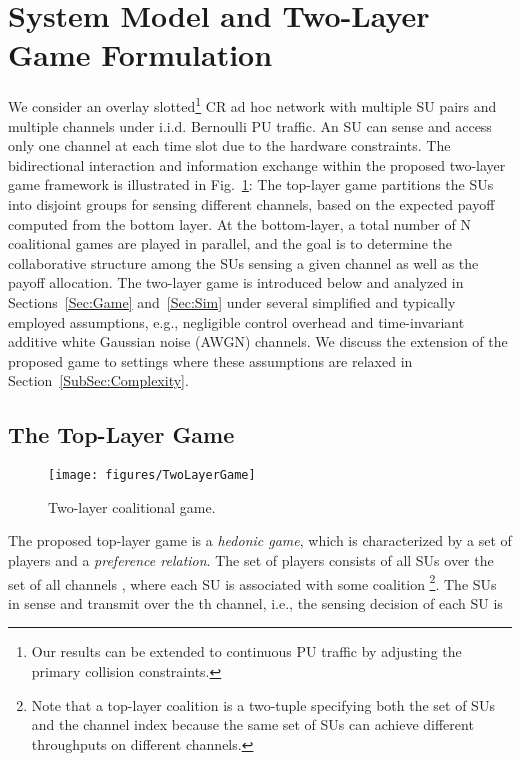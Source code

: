 \documentclass[journal,draftclsnofoot,onecolumn]{IEEEtran}
\theoremstyle{definition}
\def\FigScaleS{0.4}
\def\FigScaleS{0.45}
\begin{document}
\section{System Model and Two-Layer Game Formulation}\label{Sec:Model}
We consider an overlay slotted\footnote{\label{Note:continuousPUtraffic}Our results can be extended to continuous PU traffic by adjusting the primary collision constraints\cite{JWangChSelSurvey}.} CR ad hoc network with multiple SU pairs and multiple channels under i.i.d. Bernoulli PU traffic. An SU can sense and access only one channel at each time slot due to the hardware constraints. The bidirectional interaction and information exchange within the proposed two-layer game framework is illustrated in Fig.~\ref{Fig:TwoLayerGame}: The top-layer game partitions the SUs into  disjoint groups for sensing different channels, based on the expected payoff computed from the bottom layer. At the bottom-layer, a total number of N coalitional games are played in parallel, and the goal is to determine the collaborative structure among the SUs sensing a given channel as well as the payoff allocation. The two-layer game is introduced below and analyzed in Sections~\ref{Sec:Game} and~\ref{Sec:Sim} under several simplified and typically employed assumptions, e.g., negligible control overhead and time-invariant additive white Gaussian noise (AWGN) channels. We discuss the extension of the proposed game to settings where these assumptions are relaxed in Section~\ref{SubSec:Complexity}.
\subsection{The Top-Layer Game}\label{SubSec:TopDef}
\begin{figure}[!t]
    \centering
    \texttt{[image: figures/TwoLayerGame]}
    \caption{Two-layer coalitional game.}
    \label{Fig:TwoLayerGame}
\end{figure}

The proposed top-layer game is a \emph{hedonic game}, which is characterized by a set of players and a \emph{preference relation}\cite{Hedonic}. The set of players consists of all SUs  over the set of all channels , where each SU is associated with some coalition \footnote{Note that a top-layer coalition is a two-tuple specifying both the set of SUs  and the channel index  because the same set of SUs  can achieve different throughputs on different channels.}. The SUs in  sense and transmit over the th channel, i.e., the sensing decision of each SU  is
\end{document}

